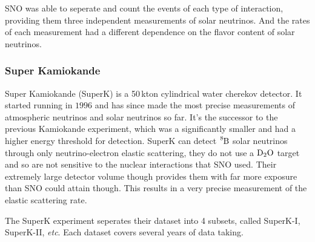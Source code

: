 SNO was able to seperate and count the events of each type of interaction,
providing them three independent measurements of solar neutrinos. And
the rates of each measurement had a different dependence on the flavor content
of solar neutrinos.


\subsubsection{Super Kamiokande}
Super Kamiokande (SuperK) is a 50\,kton cylindrical water cherekov detector.
It started running in $1996$ and has since made the most precise measurements of
atmospheric neutrinos and solar neutrinos so far.
It's the successor to the previous Kamiokande experiment, which was a significantly
smaller and had a higher energy threshold for detection.
SuperK can detect $\ce{^{8}B}$ solar neutrinos through only neutrino-electron elastic scattering,
they do not use a $\ce{D_{2}O}$ target and so are not sensitive to the
nuclear interactions that SNO used.
Their extremely large detector volume though provides them with far more exposure
than SNO could attain though. This results in a very precise measurement of the
elastic scattering rate.

The SuperK experiment seperates their dataset into 4 subsets, called
SuperK-I, SuperK-II, \textit{etc}. %
Each dataset covers several years of data taking.

